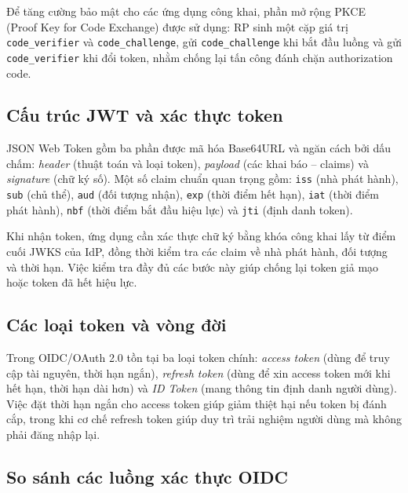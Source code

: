 Để tăng cường bảo mật cho các ứng dụng công khai, phần mở rộng
PKCE~\cite{rfc7636} (Proof Key for Code Exchange) được sử dụng: RP sinh một
cặp giá trị \texttt{code\_verifier} và \texttt{code\_challenge}, gửi
\texttt{code\_challenge} khi bắt đầu luồng và gửi \texttt{code\_verifier} khi
đổi token, nhằm chống lại tấn công đánh chặn authorization code.


\subsection{Cấu trúc JWT và xác thực token}
\label{subsec:jwt}

JSON Web Token gồm ba phần được mã hóa Base64URL và ngăn cách bởi dấu chấm:
\textit{header} (thuật toán và loại token), \textit{payload} (các khai báo --
claims) và \textit{signature} (chữ ký số). Một số claim chuẩn quan trọng gồm:
\texttt{iss} (nhà phát hành), \texttt{sub} (chủ thể), \texttt{aud} (đối tượng
nhận), \texttt{exp} (thời điểm hết hạn), \texttt{iat} (thời điểm phát hành),
\texttt{nbf} (thời điểm bắt đầu hiệu lực) và \texttt{jti} (định danh token).

Khi nhận token, ứng dụng cần xác thực chữ ký bằng khóa công khai lấy từ điểm
cuối JWKS của IdP, đồng thời kiểm tra các claim về nhà phát hành, đối tượng và
thời hạn. Việc kiểm tra đầy đủ các bước này giúp chống lại token giả mạo hoặc
token đã hết hiệu lực.

\subsection{Các loại token và vòng đời}
\label{subsec:tokenlife}

Trong OIDC/OAuth 2.0 tồn tại ba loại token chính: \textit{access token} (dùng
để truy cập tài nguyên, thời hạn ngắn), \textit{refresh token} (dùng để xin
access token mới khi hết hạn, thời hạn dài hơn) và \textit{ID Token} (mang
thông tin định danh người dùng). Việc đặt thời hạn ngắn cho access token giúp
giảm thiệt hại nếu token bị đánh cắp, trong khi cơ chế refresh token giúp duy
trì trải nghiệm người dùng mà không phải đăng nhập lại.

\subsection{So sánh các luồng xác thực OIDC}
\label{subsec:flows}

